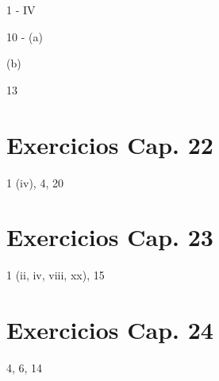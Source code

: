 \documentclass[a4paper, 12pt]{article}
\begin{document}
1 - IV

10 - (a)


(b)

13

\newpage
\section{Exercicios Cap. 22}

1 (iv), 4, 20

\newpage

\section{Exercicios Cap. 23}

1 (ii, iv, viii, xx), 15

\newpage

\section{Exercicios Cap. 24}

4, 6, 14
\end{document}
